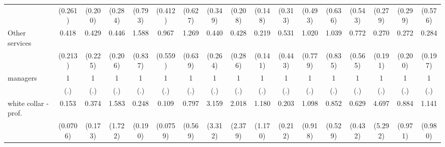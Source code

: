 {\begin{tabular}{l*{16}{c}}
                    &     (0.261)         &     (0.200)         &     (0.284)         &     (0.793)         &     (0.412)         &     (0.627)         &     (0.349)         &     (0.208)         &     (0.148)         &     (0.313)         &     (0.493)         &     (0.636)         &     (0.543)         &     (0.279)         &     (0.299)         &     (0.576)         \\
[1em]
Other services      &       0.418         &       0.429         &       0.446         &       1.588         &       0.967         &       1.269         &       0.440         &       0.428         &       0.219\sym{*}  &       0.531         &       1.020         &       1.039         &       0.772         &       0.270         &       0.272         &       0.284         \\
                    &     (0.213)         &     (0.225)         &     (0.206)         &     (0.837)         &     (0.559)         &     (0.639)         &     (0.264)         &     (0.286)         &     (0.141)         &     (0.443)         &     (0.779)         &     (0.835)         &     (0.565)         &     (0.191)         &     (0.200)         &     (0.197)         \\
[1em]
managers            &           1         &           1         &           1         &           1         &           1         &           1         &           1         &           1         &           1         &           1         &           1         &           1         &           1         &           1         &           1         &           1         \\
                    &         (.)         &         (.)         &         (.)         &         (.)         &         (.)         &         (.)         &         (.)         &         (.)         &         (.)         &         (.)         &         (.)         &         (.)         &         (.)         &         (.)         &         (.)         &         (.)         \\
[1em]
white collar - prof.&       0.153\sym{***}&       0.374\sym{*}  &       1.583         &       0.248         &       0.109\sym{**} &       0.797         &       3.159         &       2.018         &       1.180         &       0.203         &       1.098         &       0.852         &       0.629         &       4.697         &       0.884         &       1.141         \\
                    &    (0.0706)         &     (0.173)         &     (1.722)         &     (0.190)         &    (0.0759)         &     (0.569)         &     (3.312)         &     (2.379)         &     (1.170)         &     (0.212)         &     (0.918)         &     (0.529)         &     (0.432)         &     (5.292)         &     (0.971)         &     (0.980)         \\

\end{tabular}}
